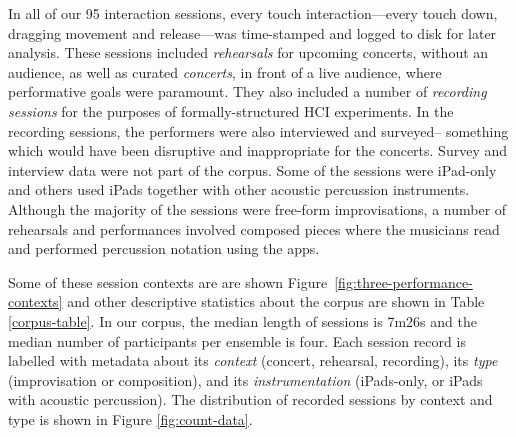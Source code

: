\documentclass{sigchi}
\begin{document}
In all of our 95 interaction sessions, every touch interaction---every
touch down, dragging movement and release---was time-stamped and
logged to disk for later analysis. These sessions included {\em rehearsals} for upcoming concerts, without an
audience, as well as curated {\em concerts}, in front of a live audience, where 
performative goals were paramount. They also included a number of {\em recording sessions}
for the purposes of formally-structured HCI experiments. In the recording
sessions, the performers were also interviewed and surveyed-- something which would have 
been disruptive and inappropriate for the concerts. Survey and interview data were not part of the
corpus. 
Some of the sessions were
iPad-only and others used iPads together with other acoustic
percussion instruments. Although the majority of the sessions were
free-form improvisations, a number of rehearsals and performances
involved composed pieces where the musicians read and performed
percussion notation using the apps.

Some of these session contexts are are shown
Figure~\ref{fig:three-performance-contexts} and other descriptive
statistics about the corpus are shown in Table \ref{corpus-table}.
In our corpus, the median length of sessions is 7m26s and the median
number of participants per ensemble is four. Each session record is
labelled with metadata about its \emph{context} (concert,
rehearsal, recording), its \emph{type} (improvisation or composition),
and its \emph{instrumentation} (iPads-only, or iPads with acoustic
percussion). The distribution of recorded sessions by context and type
is shown in Figure \ref{fig:count-data}.


\end{document}
